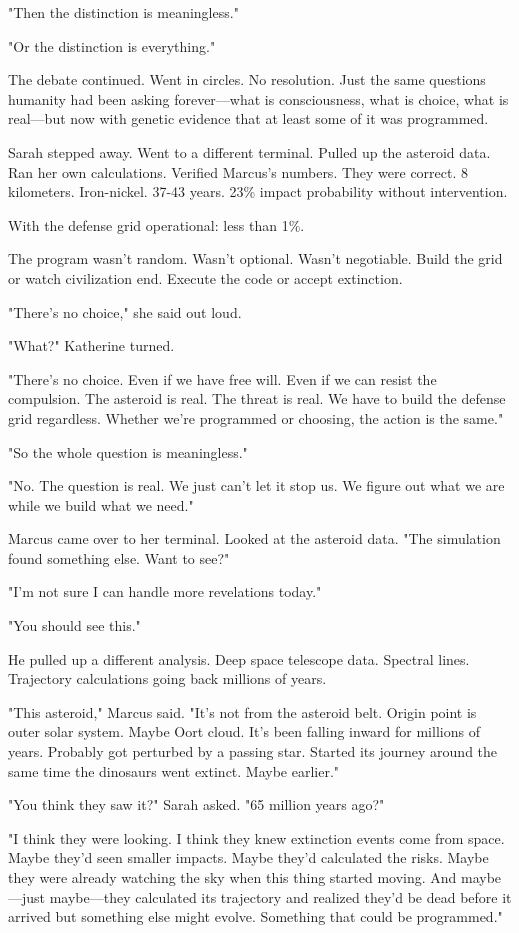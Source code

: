 "Then the distinction is meaningless."

"Or the distinction is everything."

The debate continued. Went in circles. No resolution. Just the same questions humanity had been asking forever—what is consciousness, what is choice, what is real—but now with genetic evidence that at least some of it was programmed.

Sarah stepped away. Went to a different terminal. Pulled up the asteroid data. Ran her own calculations. Verified Marcus's numbers. They were correct. 8 kilometers. Iron-nickel. 37-43 years. 23\% impact probability without intervention.

With the defense grid operational: less than 1\%.

The program wasn't random. Wasn't optional. Wasn't negotiable. Build the grid or watch civilization end. Execute the code or accept extinction.

"There's no choice," she said out loud.

"What?" Katherine turned.

"There's no choice. Even if we have free will. Even if we can resist the compulsion. The asteroid is real. The threat is real. We have to build the defense grid regardless. Whether we're programmed or choosing, the action is the same."

"So the whole question is meaningless."

"No. The question is real. We just can't let it stop us. We figure out what we are while we build what we need."

Marcus came over to her terminal. Looked at the asteroid data. "The simulation found something else. Want to see?"

"I'm not sure I can handle more revelations today."

"You should see this."

He pulled up a different analysis. Deep space telescope data. Spectral lines. Trajectory calculations going back millions of years.

"This asteroid," Marcus said. "It's not from the asteroid belt. Origin point is outer solar system. Maybe Oort cloud. It's been falling inward for millions of years. Probably got perturbed by a passing star. Started its journey around the same time the dinosaurs went extinct. Maybe earlier."

"You think they saw it?" Sarah asked. "65 million years ago?"

"I think they were looking. I think they knew extinction events come from space. Maybe they'd seen smaller impacts. Maybe they'd calculated the risks. Maybe they were already watching the sky when this thing started moving. And maybe—just maybe—they calculated its trajectory and realized they'd be dead before it arrived but something else might evolve. Something that could be programmed."

